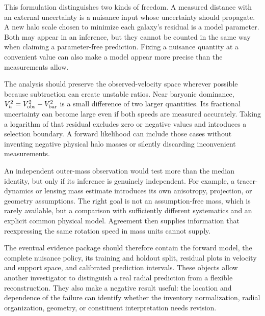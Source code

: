 This formulation distinguishes two kinds of freedom. A measured distance with an external uncertainty is a nuisance input whose uncertainty should propagate. A new halo scale chosen to minimize each galaxy's residual is a model parameter. Both may appear in an inference, but they cannot be counted in the same way when claiming a parameter-free prediction. Fixing a nuisance quantity at a convenient value can also make a model appear more precise than the measurements allow.

The analysis should preserve the observed-velocity space wherever possible because subtraction can create unstable ratios. Near baryonic dominance, $V_h^2=V_{\rm obs}^2-V_{\rm bar}^2$ is a small difference of two larger quantities. Its fractional uncertainty can become large even if both speeds are measured accurately. Taking a logarithm of that residual excludes zero or negative values and introduces a selection boundary. A forward likelihood can include those cases without inventing negative physical halo masses or silently discarding inconvenient measurements.

An independent outer-mass observation would test more than the median identity, but only if its inference is genuinely independent. For example, a tracer-dynamics or lensing mass estimate introduces its own anisotropy, projection, or geometry assumptions. The right goal is not an assumption-free mass, which is rarely available, but a comparison with sufficiently different systematics and an explicit common physical model. Agreement then supplies information that reexpressing the same rotation speed in mass units cannot supply.

The eventual evidence package should therefore contain the forward model, the complete nuisance policy, its training and holdout split, residual plots in velocity and support space, and calibrated prediction intervals. These objects allow another investigator to distinguish a real radial prediction from a flexible reconstruction. They also make a negative result useful: the location and dependence of the failure can identify whether the inventory normalization, radial organization, geometry, or constituent interpretation needs revision.

